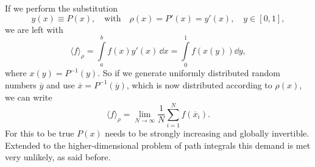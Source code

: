 %
%
If we perform the substitution
%
%
\begin{equation}
y(x) \equiv P(x), \quad \text{with} \quad \rho(x) = P'(x)=y'(x), \quad y \in [0,1],
\end{equation}
%
%
we are left with
%
%
\begin{equation}
\langle f \rangle_{\rho} = \int \limits_{a}^{b}f(x) y'(x) \,\dd x = \int\limits_{0}^{1} f\left(x\left(y\right)\right) \dd y,
\end{equation}
%
%
where $x(y)=P^{-1}(y)$. So if we generate uniformly distributed random numbers $\overline{y}$ and use $\overline{x}=P^{-1}(\overline{y})$, which is now distributed according to $\rho(x)$, we can write
%
%
\begin{equation}
\langle f \rangle_{\rho} = \lim_{N \to \infty} \dfrac{1}{N} \sum\limits_{i=1}^{N} f(\overline{x}_{i}).
\end{equation}
%
%
For this to be true $P(x)$ needs to be strongly increasing and globally invertible. Extended to the higher-dimensional problem of path integrals this demand is met very unlikely, as said before.

